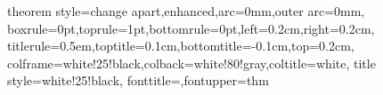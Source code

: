 
\usepackage[a4paper, margin=2cm]{geometry}
\usepackage{parskip} %

\usepackage{amsfonts, amsmath, amsthm, amssymb}
\usepackage{mathtools}
\usepackage{esint}
\usepackage{titleps}

\usepackage{graphicx}
\usepackage{epstopdf}

\usepackage{dirtytalk}

\usepackage[Lenny]{fncychap}

\usepackage{subfiles}

\newcommand{\diff}{\mathop{}\!\mathrm{d}}

\usepackage{bm}
\newcommand{\vv}[1]{\bm{\mathrm{#1}}}

\DeclarePairedDelimiter\ceil{\lceil}{\rceil}
\DeclarePairedDelimiter\floor{\lfloor}{\rfloor}




\usepackage{tcolorbox}
{theorem style=change apart,enhanced,arc=0mm,outer arc=0mm,
    boxrule=0pt,toprule=1pt,bottomrule=0pt,left=0.2cm,right=0.2cm,
    titlerule=0.5em,toptitle=0.1cm,bottomtitle=-0.1cm,top=0.2cm,
    colframe=white!25!black,colback=white!80!gray,coltitle=white,
    title style={white!25!black},
    fonttitle=\sffamily,fontupper=\normalsize}{thm}

